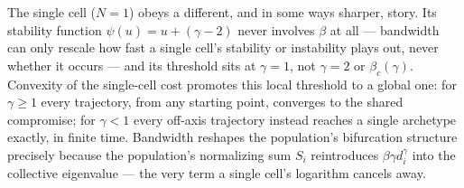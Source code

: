 \documentclass[11pt,a4paper]{article}
\theoremstyle{plain}
\theoremstyle{definition}
\theoremstyle{remark}
\newcommand{\bw}{\beta}
\newcommand{\bwc}{\beta_c}
\begin{document}
The single cell ($N=1$) obeys a different, and in some ways sharper, story.
Its stability function $\psi(u)=u+(\gamma-2)$ never involves $\bw$ at all —
bandwidth can only rescale how fast a single cell's stability or
instability plays out, never whether it occurs — and its threshold sits at
$\gamma=1$, not $\gamma=2$ or $\bwc(\gamma)$. Convexity of the single-cell
cost promotes this local threshold to a global one: for $\gamma\ge1$ every
trajectory, from any starting point, converges to the shared compromise;
for $\gamma<1$ every off-axis trajectory instead reaches a single archetype
exactly, in finite time. Bandwidth reshapes the population's bifurcation
structure precisely because the population's normalizing sum $S_i$
reintroduces $\bw\gamma d_i^\gamma$ into the collective eigenvalue — the
very term a single cell's logarithm cancels away.
\end{document}

